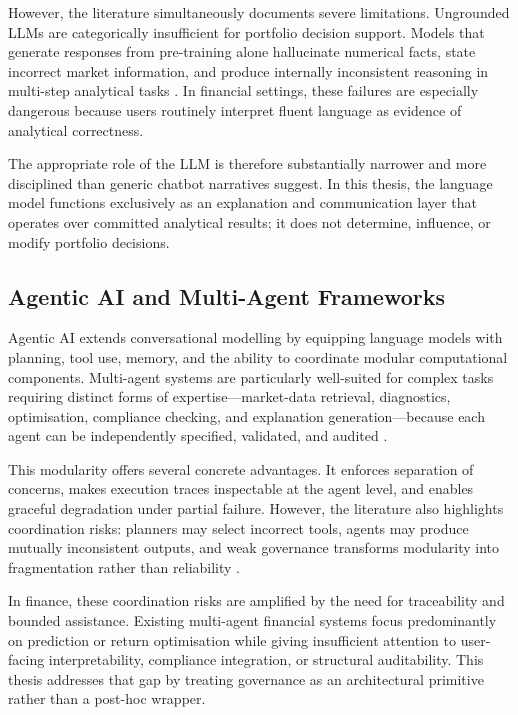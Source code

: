 \documentclass[11pt]{article}
\begin{document}
However, the literature simultaneously documents severe limitations. Ungrounded LLMs are categorically insufficient for portfolio decision support. Models that generate responses from pre-training alone hallucinate numerical facts, state incorrect market information, and produce internally inconsistent reasoning in multi-step analytical tasks \cite{ji2023,li2023}. In financial settings, these failures are especially dangerous because users routinely interpret fluent language as evidence of analytical correctness.

The appropriate role of the LLM is therefore substantially narrower and more disciplined than generic chatbot narratives suggest. In this thesis, the language model functions exclusively as an explanation and communication layer that operates over committed analytical results; it does not determine, influence, or modify portfolio decisions.

\subsection{Agentic AI and Multi-Agent Frameworks}
Agentic AI extends conversational modelling by equipping language models with planning, tool use, memory, and the ability to coordinate modular computational components. Multi-agent systems are particularly well-suited for complex tasks requiring distinct forms of expertise---market-data retrieval, diagnostics, optimisation, compliance checking, and explanation generation---because each agent can be independently specified, validated, and audited \cite{jennings1998,wooldridge2009,hayesroth1985}.

This modularity offers several concrete advantages. It enforces separation of concerns, makes execution traces inspectable at the agent level, and enables graceful degradation under partial failure. However, the literature also highlights coordination risks: planners may select incorrect tools, agents may produce mutually inconsistent outputs, and weak governance transforms modularity into fragmentation rather than reliability \cite{amershi2014,holzinger2016,ji2023}.

In finance, these coordination risks are amplified by the need for traceability and bounded assistance. Existing multi-agent financial systems focus predominantly on prediction or return optimisation while giving insufficient attention to user-facing interpretability, compliance integration, or structural auditability. This thesis addresses that gap by treating governance as an architectural primitive rather than a post-hoc wrapper.
\end{document}
